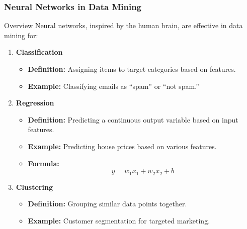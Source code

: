 \documentclass[aspectratio=169]{beamer}
\begin{document}
\begin{frame}[fragile]
    \frametitle{Neural Networks in Data Mining}

    \begin{block}{Overview}
        Neural networks, inspired by the human brain, are effective in data mining for:
    \end{block}

    \begin{enumerate}
        \item \textbf{Classification}
        \begin{itemize}
            \item \textbf{Definition:} Assigning items to target categories based on features.
            \item \textbf{Example:} Classifying emails as “spam” or “not spam.”
        \end{itemize}
        
        \item \textbf{Regression}
        \begin{itemize}
            \item \textbf{Definition:} Predicting a continuous output variable based on input features.
            \item \textbf{Example:} Predicting house prices based on various features.
            \item \textbf{Formula:}
            \begin{equation}
                y = w_1x_1 + w_2x_2 + b
            \end{equation}
        \end{itemize}

        \item \textbf{Clustering}
        \begin{itemize}
            \item \textbf{Definition:} Grouping similar data points together.
            \item \textbf{Example:} Customer segmentation for targeted marketing.
        \end{itemize}
    \end{enumerate}
\end{frame}
\end{document}
